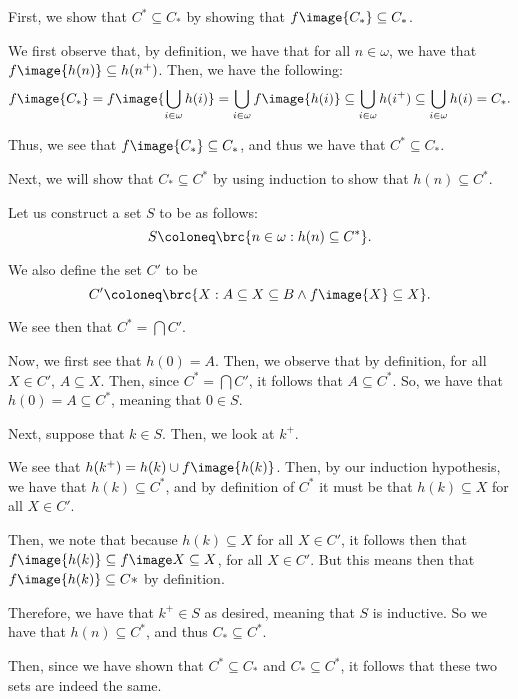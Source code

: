\documentclass{article}
\begin{document}
\begin{solution}
	First, we show that $C^{*} \subseteq C_{*}$ by showing that $f\image{C_{*}} \subseteq C_{*}$.
	\begin{innerproof}
		We first observe that, by definition, we have that for all $n \in \omega$, we have that $f\image{h(n)} \subseteq h(n^{+})$. Then, we have the following:
		\begin{equation*}
			f\image{C_{*}} = f\image{\bigcup_{i \in \omega} h(i)} = \bigcup_{i\in\omega} f\image{h(i)} \subseteq \bigcup_{i \in \omega} h(i^{+}) \subseteq \bigcup_{i\in\omega} h(i) = C_{*}.
		\end{equation*}
		
		Thus, we see that $f\image{C_{*}} \subseteq C_{*}$, and thus we have that $C^{*} \subseteq C_{*}$.
	\end{innerproof}
	
	Next, we will show that $C_{*} \subseteq C^{*}$ by using induction to show that $h(n) \subseteq C^{*}$. 
	\begin{innerproof}
		Let us construct a set $S$ to be as follows:
		\begin{equation*}
			S \coloneq \brc{n \in \omega : h(n) \subseteq C^{*}}.
		\end{equation*}
		
		We also define the set $C'$ to be
		\begin{equation*}
			C' \coloneq \brc{X : A \subseteq X \subseteq B \land f\image{X} \subseteq X}.
		\end{equation*}
		
		We see then that $C^{*} = \bigcap C'$.
		
		Now, we first see that $h(0) = A$. Then, we observe that by definition, for all $X \in C'$, $A \subseteq X$. Then, since $C^{*} = \bigcap C'$, it follows that $A \subseteq C^{*}$. So, we have that $h(0) = A \subseteq C^{*}$, meaning that $0 \in S$.
		
		Next, suppose that $k \in S$. Then, we look at $k^{+}$.
		
		We see that $h(k^{+}) = h(k) \cup f\image{h(k)}$. Then, by our induction hypothesis, we have that $h(k) \subseteq C^{*}$, and by definition of $C^{*}$ it must be that $h(k) \subseteq X$ for all $X \in C'$.
		
		Then, we note that because $h(k) \subseteq X$ for all $X \in C'$, it follows then that $f\image{h(k)} \subseteq f\image X \subseteq X$, for all $X \in C'$. But this means then that $f\image{h(k)} \subseteq C*$ by definition.
		
		Therefore, we have that $k^{+} \in S$ as desired, meaning that $S$ is inductive. So we have that $h(n) \subseteq C^{*}$, and thus $C_{*} \subseteq C^{*}$.
	\end{innerproof}

	Then, since we have shown that $C^{*} \subseteq C_{*}$ and $C_{*} \subseteq C^{*}$, it follows that these two sets are indeed the same.
\end{solution}
\end{document}
